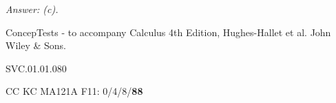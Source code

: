 {\it Answer: (c).} 

\medskip
ConcepTests - to accompany Calculus 4th Edition, Hughes-Hallet et al. John Wiley \& Sons.

SVC.01.01.080



CC KC MA121A F11: 0/4/8/{\bf88}  \\  \\
